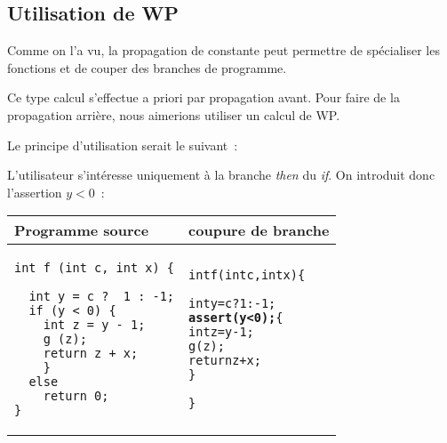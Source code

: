 \subsection{Utilisation de WP}

Comme on l'a vu, la propagation de constante peut permettre de
spécialiser les fonctions et de couper des branches de programme.

Ce type calcul s'effectue a priori par propagation avant.
Pour faire de la propagation arrière,
nous aimerions utiliser un calcul de WP.

Le principe d'utilisation serait le suivant~:

\begin{exemple1}
  L'utilisateur s'intéresse uniquement à la branche {\it then} du {\it if}.
  On introduit donc l'assertion $y<0$~:\\

\begin{center}
\begin{footnotesize}
\begin{tabular}{|p{5cm}|p{5cm}|}
  \hline
Programme source & coupure de branche \\
  \hline
\begin{verbatim}
int f (int c, int x) {

  int y = c ?  1 : -1;
  if (y < 0) {
    int z = y - 1;
    g (z);
    return z + x;
    }
  else
    return 0;
}
\end{verbatim}
&
\begin{alltt}
int f (int c, int x) \{

  int y = c ?  1 : -1;
 {\bf assert (y < 0); }\{
  int z = y - 1;
  g (z);
  return z + x;
  \}


\}
\end{alltt}
\\
\hline
\end{tabular}
\end{footnotesize}
\end{center}
\end{exemple1}
